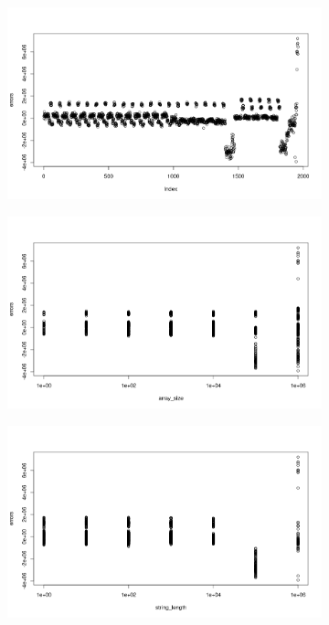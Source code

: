 \documentclass{article}
\begin{document}
\begin{figure}
  \centering
   \begin{subfigure}{0.49\textwidth}
    \centering
    \includegraphics[width=\textwidth]{../io_local_tests/prediction_errors.png}
  \end{subfigure}
   \begin{subfigure}{0.49\textwidth}
    \centering
    \includegraphics[width=\textwidth]{../io_local_tests/errors_per_variable1.png}
  \end{subfigure}
   \begin{subfigure}{0.49\textwidth}
    \centering
    \includegraphics[width=\textwidth]{../io_local_tests/errors_per_variable2.png}

\end{subfigure}
\end{figure}
\end{document}
